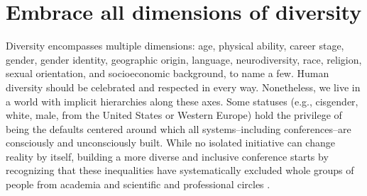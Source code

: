 \documentclass[10pt,letterpaper]{article}
\begin{document}


\section{Embrace all dimensions of diversity}
\label{rule_diversity}

Diversity encompasses multiple dimensions: age, physical ability, career stage, gender, gender identity, geographic origin, language, neurodiversity, race, religion, sexual orientation, and socioeconomic background, to name a few.
Human diversity should be celebrated and respected in every way. Nonetheless, we live in a world with implicit hierarchies along these axes. Some statuses (e.g., cisgender, white, male, from the United States or Western Europe) hold the privilege of being the defaults centered around which all systems--including conferences--are consciously and unconsciously built.  
While no isolated initiative can change reality by itself, building a more diverse and inclusive conference starts by recognizing that these inequalities have systematically excluded whole groups of people from academia and scientific and professional circles \cite{timperleyHeMoanaPukepuke2020}. 
\end{document}
